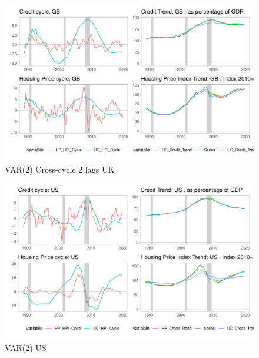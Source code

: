 \documentclass[
  12pt,
]{article}
\begin{document}
\begin{figure}

{\centering \includegraphics[width=0.85\linewidth]{../../Regression/VAR_2_crosscycle/Output/Graphs/HP_Credit_4graphs_GB} 

}

\caption{VAR(2) Cross-cycle 2 lags UK}\label{fig:unnamed-chunk-3}
\end{figure}

\begin{figure}

{\centering \includegraphics[width=0.85\linewidth]{../../Regression/VAR_2/Output/Graphs/HP_Credit_4graphs_US} 

}

\caption{VAR(2) US}\label{fig:unnamed-chunk-4}
\end{figure}
\end{document}
